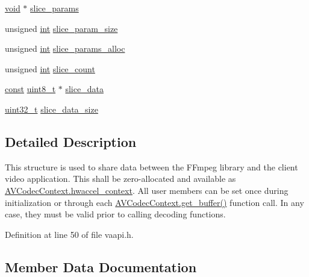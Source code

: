 \begin{DoxyCompactItemize}
\item 
\hyperlink{sound_8c_ae35f5844602719cf66324f4de2a658b3}{void} $\ast$ \hyperlink{structvaapi__context_a0d9697f059f448fa6863787ce8f03bd5}{slice\+\_\+params}
\item 
unsigned \hyperlink{xmltok_8h_a5a0d4a5641ce434f1d23533f2b2e6653}{int} \hyperlink{structvaapi__context_a0bad2e1063982d9c1c28964fb0cf402b}{slice\+\_\+param\+\_\+size}
\item 
unsigned \hyperlink{xmltok_8h_a5a0d4a5641ce434f1d23533f2b2e6653}{int} \hyperlink{structvaapi__context_aeafe25a810ba11d4b81f12cd940d6313}{slice\+\_\+params\+\_\+alloc}
\item 
unsigned \hyperlink{xmltok_8h_a5a0d4a5641ce434f1d23533f2b2e6653}{int} \hyperlink{structvaapi__context_ab4dc6ff8af4a58cf53520f7b6435e6dd}{slice\+\_\+count}
\item 
\hyperlink{getopt1_8c_a2c212835823e3c54a8ab6d95c652660e}{const} \hyperlink{lib-src_2ffmpeg_2win32_2stdint_8h_a9a941819355e6f658991890ff66b4b0e}{uint8\+\_\+t} $\ast$ \hyperlink{structvaapi__context_ac013038c1faa1cbaf0aa132ada52414c}{slice\+\_\+data}
\item 
\hyperlink{lib-src_2ffmpeg_2win32_2stdint_8h_a6eb1e68cc391dd753bc8ce896dbb8315}{uint32\+\_\+t} \hyperlink{structvaapi__context_ab2444cafb4a40251c026c73d049fe84a}{slice\+\_\+data\+\_\+size}
\end{DoxyCompactItemize}


\subsection{Detailed Description}
This structure is used to share data between the F\+Fmpeg library and the client video application. This shall be zero-\/allocated and available as \hyperlink{struct_a_v_codec_context_ab222f7d747dfdceff0a76999e09648c0}{A\+V\+Codec\+Context.\+hwaccel\+\_\+context}. All user members can be set once during initialization or through each \hyperlink{struct_a_v_codec_context_abc3a806b73306162efa218510448d54f}{A\+V\+Codec\+Context.\+get\+\_\+buffer()} function call. In any case, they must be valid prior to calling decoding functions. 

Definition at line 50 of file vaapi.\+h.



\subsection{Member Data Documentation}
